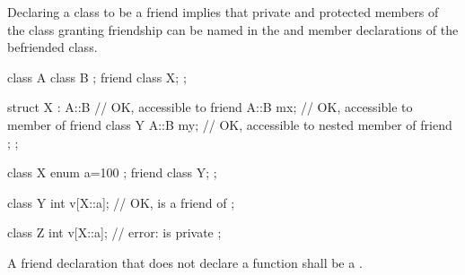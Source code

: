 \pnum
{}%
Declaring a class to be a friend implies that private and
protected members of the class granting friendship can be named in the
 and member declarations of the befriended
class.
\begin{example}
\begin{codeblock}
class A {
  class B { };
  friend class X;
};

struct X : A::B {               // OK,  accessible to friend
  A::B mx;                      // OK,  accessible to member of friend
  class Y {
    A::B my;                    // OK,  accessible to nested member of friend
  };
};
\end{codeblock}
\end{example}
\begin{example}
\begin{codeblock}
class X {
  enum { a=100 };
  friend class Y;
};

class Y {
  int v[X::a];                  // OK,  is a friend of 
};

class Z {
  int v[X::a];                  // error:  is private
};
\end{codeblock}
\end{example}

\pnum
A friend declaration that does not declare a function
shall be a .

